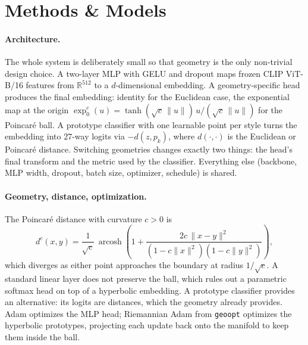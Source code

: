 \section{Methods \& Models}
\label{sec:methods}

\paragraph{Architecture.} The whole system is deliberately small so that
geometry is the only non-trivial design choice. A two-layer MLP with
GELU and dropout maps frozen CLIP ViT-B/16 features
\citep{radford2021clip} from $\mathbb{R}^{512}$ to a $d$-dimensional
embedding. A geometry-specific head produces the final embedding:
identity for the Euclidean case, the exponential map at the origin
$\exp_0^c(u) = \tanh(\sqrt{c}\,\|u\|) \, u / (\sqrt{c}\,\|u\|)$ for the
Poincar\'e ball. A prototype classifier with one learnable point per
style turns the embedding into 27-way logits via $-d(z, p_k)$, where
$d(\cdot,\cdot)$ is the Euclidean or Poincar\'e distance. Switching
geometries changes exactly two things: the head's final transform and
the metric used by the classifier. Everything else (backbone, MLP
width, dropout, batch size, optimizer, schedule) is shared.

\paragraph{Geometry, distance, optimization.} The Poincar\'e distance
with curvature $c > 0$ is
\[
  d^c(x, y) = \frac{1}{\sqrt{c}}\,\operatorname{arcosh}\!\left(
    1 + \frac{2c\,\|x-y\|^2}{(1-c\|x\|^2)(1-c\|y\|^2)}
  \right),
\]
which diverges as either point approaches the boundary at radius
$1/\sqrt{c}$. A standard linear layer does not preserve the ball,
which rules out a parametric softmax head on top of a hyperbolic
embedding. A prototype classifier provides an alternative: its
logits are distances, which the geometry already provides. Adam
optimizes the MLP head; Riemannian Adam from \texttt{geoopt}
\citep{kochurov2020geoopt} optimizes the hyperbolic prototypes,
projecting each update back onto the manifold to keep them inside the
ball.

